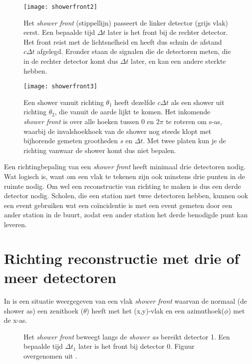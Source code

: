 \begin{figure}
    \centering
    \texttt{[image: showerfront2]}
    \caption{Het \emph{shower front} (stippellijn) passeert de linker
             detector (grijs vlak) eerst. Een bepaalde tijd $\Delta t$
             later is het front bij de rechter detector. Het front reist
             met de lichtsnelheid en heeft dus schuin de afstand
             $c\Delta t$ afgelegd. Eronder staan de signalen die de
             detectoren meten, die in de rechter detector komt dus
             $\Delta t$ later, en kan een andere sterkte hebben.}
   \label{fig:showerfront2}
\end{figure}

\begin{figure}
    \centering
    \texttt{[image: showerfront3]}
    \caption{Een shower vanuit richting $\theta_1$ heeft dezelfde
             $c\Delta t$ als een shower uit richting $\theta_2$, die
             vanuit de aarde lijkt te komen. Het inkomende \emph{shower
             front} is over alle hoeken tussen 0 en 2$\pi$ te roteren om
             s-as, waarbij de invalshoekhoek van de shower nog steeds
             klopt met bijhorende gemeten grootheden $s$ en $\Delta t$.
             Met twee platen kun je de richting vanwaar de shower komt
             dus niet bepalen.}
   \label{fig:showerfront3}
\end{figure}

Een richtingbepaling van een \emph{shower front} heeft minimaal drie
detectoren nodig. Wat logisch is, want om een vlak te tekenen zijn ook
minstens drie punten in de ruimte nodig. Om wel een reconstructie van
richting te maken is dus een derde detector nodig. Scholen, die een
station met twee detectoren hebben, kunnen ook een event gebruiken wat
een coïncidentie is met een event gemeten door een ander station in de
buurt, zodat een ander station het derde benodigde punt kan leveren. 


\section{Richting reconstructie met drie of meer detectoren}

In  is een situatie weergegeven van een vlak
\emph{shower front} waarvan de normaal (de shower as) een zenithoek
($\theta$) heeft met het (x,y)-vlak en een azimuthoek($\phi$) met de
x-as.

\begin{figure}
    \centering
    
    \caption{Het \emph{shower front} beweegt langs de \emph{shower as}
             bereikt detector 1. Een bepaalde tijd $\Delta t_1$ later is
             het front bij detector 0. Figuur overgenomen uit
             \cite{Fokkema}.}
  \label{fig:frontthesis}
\end{figure}

